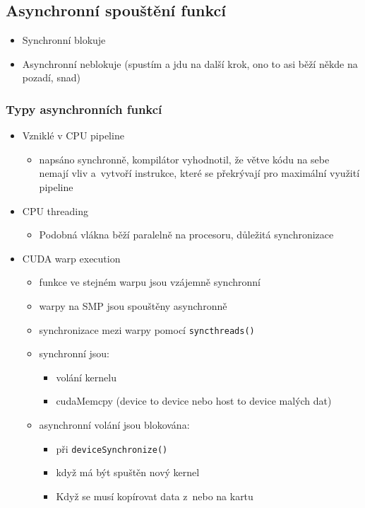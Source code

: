 \subsection{Asynchronní spouštění funkcí}
\begin{itemize}
    \item Synchronní blokuje
    \item Asynchronní neblokuje (spustím a jdu na další krok, ono to asi běží někde na pozadí, snad)
\end{itemize}

\subsubsection{Typy asynchronních funkcí}
\begin{itemize}
    \item Vzniklé v CPU pipeline
    \begin{itemize}
        \item napsáno synchronně, kompilátor vyhodnotil, že větve kódu na sebe nemají vliv a~vytvoří instrukce, které se překrývají pro maximální využití pipeline
    \end{itemize}
    \item CPU threading
    \begin{itemize}
        \item Podobná vlákna běží paralelně na procesoru, důležitá synchronizace
    \end{itemize}
    \item CUDA warp execution
    \begin{itemize}
        \item funkce ve stejném warpu jsou vzájemně synchronní
        \item warpy na SMP jsou spouštěny asynchronně
        \item synchronizace mezi warpy pomocí \texttt{syncthreads()}
        \item synchronní jsou:
        \begin{itemize}
            \item volání kernelu
            \item cudaMemcpy (device to device nebo host to device malých dat)
        \end{itemize}
        \item asynchronní volání jsou blokována:
        \begin{itemize}
            \item při \texttt{deviceSynchronize()}
            \item když má být spuštěn nový kernel
            \item Když se musí kopírovat data z~nebo na kartu
        \end{itemize}
    \end{itemize}
\end{itemize}

